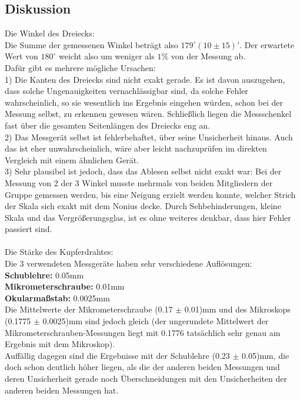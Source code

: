 \documentclass[12pt,a4paper]{article}
\begin{document}
\begin{multicols}{2}
\subsection{Diskussion}
Die Winkel des Dreiecks:\\
Die Summe der gemessenen Winkel beträgt also $179^{\circ}(10 \pm 15)'$. Der erwartete Wert von $180^{\circ}$ weicht also um weniger als $1\%$ von der Messung ab.\\
Dafür gibt es mehrere mögliche Ursachen:\\
1) Die Kanten des Dreiecks sind nicht exakt gerade. Es ist davon auszugehen, dass solche Ungenauigkeiten vernachlässigbar sind, da solche Fehler wahrscheinlich, so sie wesentlich ins Ergebnis eingehen würden, schon bei der Messung selbst, zu erkennen gewesen wären. Schließlich liegen die Messschenkel fast über die gesamten Seitenlängen des Dreiecks eng an.\\
2) Das Messgerät selbst ist fehlerbehaftet, über seine Unsicherheit hinaus. Auch das ist eher unwahrscheinlich, wäre aber leicht nachzuprüfen im direkten Vergleich mit einem ähnlichen Gerät.\\
3) Sehr plausibel ist jedoch, dass das Ablesen selbst nicht exakt war: Bei der Messung von 2 der 3 Winkel musste mehrmals von beiden Mitgliedern der Gruppe gemessen werden, bis eine Neigung erzielt werden konnte, welcher Strich der Skala sich exakt mit dem Nonius decke. Durch Sehbehinderungen, kleine Skala und das Vergrößerungsglas, ist es ohne weiteres denkbar, dass hier Fehler passiert sind.\\
\\
Die Stärke des Kupferdrahtes:\\
Die 3 verwendeten Messgeräte haben sehr verschiedene Auflösungen:\\
\textbf{Schublehre:} 0.05mm\\
\textbf{Mikrometerschraube:} 0.01mm\\
\textbf{Okularmaßstab:} 0.0025mm\\
Die Mittelwerte der Mikrometerschraube (0.17 $\pm$ 0.01)mm und des Mikroskops (0.1775 $\pm$ 0.0025)mm sind jedoch gleich (der ungerundete Mittelwert der Mikrometerschrauben-Messungen liegt mit 0.1776 tatsächlich sehr genau am Ergebnis mit dem Mikroskop).\\
Auffällig dagegen sind die Ergebnisse mit der Schublehre (0.23 $\pm$ 0.05)mm, die doch schon deutlich höher liegen, als die der anderen beiden Messungen und deren Unsicherheit gerade noch Überschneidungen mit den Unsicherheiten der anderen beiden Messungen hat.\\

\end{multicols}
\end{document}
